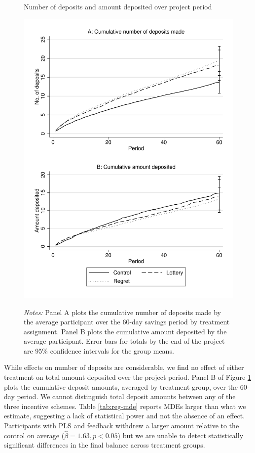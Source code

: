 \documentclass[12pt]{article}
\begin{document}
		\begin{figure}[ht]
			\caption{Number of deposits and amount deposited over project period}
			\includegraphics[height=0.85\textheight]{../../figures/line-cumdeposits.pdf}
			\label{fig:line-cumdeposits}
			\caption*{\footnotesize \emph{Notes:} Panel A plots the cumulative number of deposits made by the average participant over the 60-day savings period by treatment assignment. Panel B plots the cumulative amount deposited by the average participant. Error bars for totals by the end of the project are 95\% confidence intervals for the group means.}
		\end{figure}

		\clearpage

		While effects on number of deposits are considerable, we find no effect of either treatment on total amount deposited over the project period. Panel B of Figure \ref{fig:line-cumdeposits} plots the cumulative deposit amounts, averaged by treatment group, over the 60-day period. We cannot distinguish total deposit amounts between any of the three incentive schemes. Table \ref{tab:reg-mde} reports MDEs larger than what we estimate, suggesting a lack of statistical power and not the absence of an effect. Participants with PLS and feedback withdrew a larger amount relative to the control on average ($\hat \beta = 1.63, p < 0.05$) but we are unable to detect statistically significant differences in the final balance across treatment groups.
\end{document}
